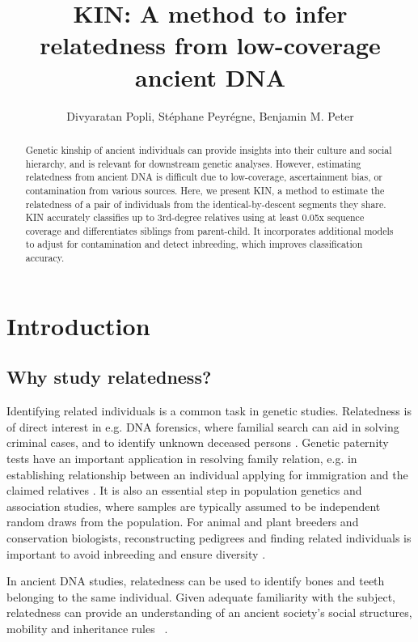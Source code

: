 \documentclass[12pt, letterpaper]{article}
\title{KIN: A method to infer relatedness from low-coverage ancient DNA}
\author{Divyaratan Popli, Stéphane Peyrégne, Benjamin M. Peter}
\begin{document}
\maketitle


\begin{abstract}

\noindent Genetic kinship of ancient individuals can provide insights into their culture and social
hierarchy, and is relevant for downstream genetic analyses. However, estimating
relatedness from ancient DNA is difficult due to low-coverage, ascertainment bias, or
contamination from various sources. Here, we present KIN, a method to estimate the
relatedness of a pair of individuals from the identical-by-descent segments they share.
KIN accurately classifies up to 3rd-degree relatives using at least 0.05x sequence coverage
and differentiates siblings from parent-child. It incorporates additional models to adjust
for contamination and detect inbreeding, which improves classification accuracy.
\end{abstract}

\section{Introduction}

\subsection{Why study relatedness?}

Identifying related individuals is a common task in genetic studies. Relatedness is of direct interest in e.g. DNA forensics, where familial search can aid in solving criminal cases, and to identify unknown deceased persons \cite{murphy_law_2018,ram_genealogy_2018}. Genetic paternity tests have an important application in resolving family relation, e.g. in establishing relationship between an individual applying for immigration and the claimed relatives \cite{egeland_beyond_2000}. It is also an essential step in population genetics and association studies, where samples are typically assumed to be independent random draws from the population. For animal and plant breeders and conservation biologists, reconstructing pedigrees and finding related individuals is important to avoid inbreeding and ensure diversity \cite{habier_impact_2007,oliehoek_estimating_2006,kardos_measuring_2015}.

In ancient DNA studies, relatedness can be used to identify bones and teeth belonging to the same individual. Given adequate familiarity with the subject, relatedness can provide an understanding of an ancient society's social structures, mobility and inheritance rules ~\cite{baca_ancient_2012,mittnik_kinship-based_2019,sikora_ancient_2017}.
\end{document}
